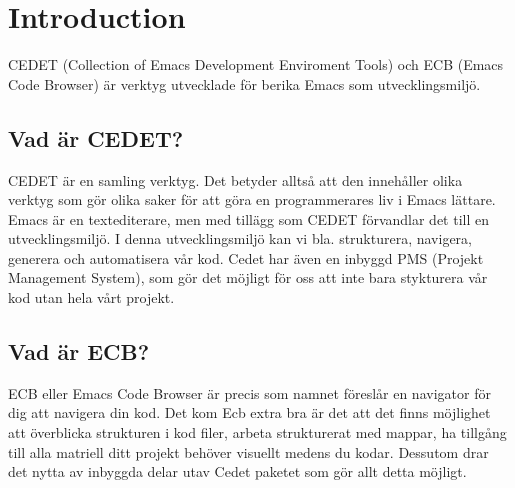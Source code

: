 \documentclass[12pt]{article} %
\begin{document}

\tableofcontents %

\newpage %


\section{Introduction} %

CEDET (Collection of Emacs Development Enviroment Tools) och ECB (Emacs Code Browser) är verktyg utvecklade för berika Emacs som utvecklingsmiljö. %


\subsection{Vad är CEDET?} %

CEDET är en samling verktyg. Det betyder alltså att den innehåller olika verktyg som gör olika saker för att göra en programmerares liv i Emacs lättare. 
Emacs är en textediterare, men med tillägg som CEDET förvandlar det till en utvecklingsmiljö.  I denna utvecklingsmiljö kan vi bla. strukturera, navigera, generera och automatisera vår kod. Cedet har även en inbyggd PMS (Projekt Management System), som gör det möjligt för oss att inte bara stykturera vår kod utan hela vårt projekt.


\subsection{Vad är ECB?} %

ECB eller Emacs Code Browser är precis som namnet föreslår en navigator för dig att navigera din kod. Det kom Ecb extra bra är det att det finns möjlighet att överblicka strukturen i kod filer, arbeta strukturerat med mappar, ha tillgång till alla matriell ditt projekt behöver visuellt medens du kodar. Dessutom drar det nytta av inbyggda delar utav Cedet paketet som gör allt detta möjligt. 
\end{document}
